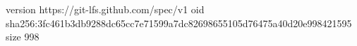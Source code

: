 version https://git-lfs.github.com/spec/v1
oid sha256:3fc461b3db9288dc65cc7e71599a7dc82698655105d76475a40d20e998421595
size 998
